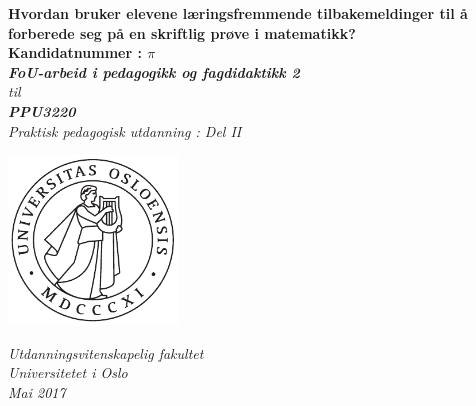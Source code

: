 \documentclass[main.tex]{subfiles}
\begin{document}
\thispagestyle{empty}
\begin{center}        %
  \vspace{5mm}        %
  \LARGE
  \textbf{Hvordan bruker elevene læringsfremmende tilbakemeldinger 
  til å forberede seg på en skriftlig prøve i matematikk?} \\
  \Large
  \vspace{10mm}
  \large
  \textbf{Kandidatnummer : $\pi$} \\
  \vspace{20mm}
  \Large
  {\bf{\textsl{FoU-arbeid i pedagogikk og fagdidaktikk 2}}} \\
  \textsl{til} \\
  \vspace{2mm}
  {\bf{\textsl{PPU3220}}} \\
  \vspace{5mm}
  {\large \textsl {Praktisk pedagogisk utdanning : Del II}}\\
  \vspace{10mm}
  \centerline{\includegraphics[width=45mm,height=45mm]{../figures/uiosegl.pdf}} 
  \vspace{8mm}
  \textsl{Utdanningsvitenskapelig fakultet} \\
  \textsl{Universitetet i Oslo} \\
  \vspace{5mm}
  \large
  \textsl{Mai 2017} \\
  \vspace{2cm}


\end{center}
\end{document}
